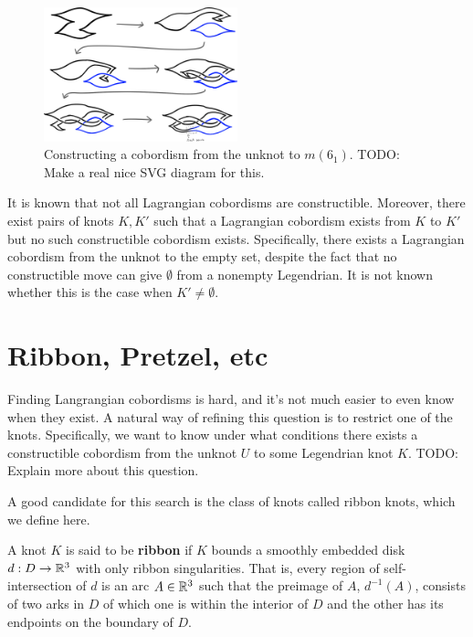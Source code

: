 \begin{figure}[ht!]
    \centering
    \includegraphics[width=0.5\textwidth]{images/cobordism-construction.png}
    \caption{Constructing a cobordism from the unknot to $m(6_1)$.
    TODO: Make a real nice SVG diagram for this.}%
    \label{fig:cobordism-construction}
\end{figure}

It is known that not all Lagrangian cobordisms are constructible. Moreover, there exist pairs of knots $K, K'$ such that a Lagrangian cobordism exists from $K$ to $K'$ but no such constructible cobordism exists. Specifically, there exists a Lagrangian cobordism from the unknot to the empty set, despite the fact that no constructible move can give $\emptyset$ from a nonempty Legendrian. It is not known whether this is the case when $K' \neq \emptyset$.

\section{Ribbon, Pretzel, etc}

Finding Langrangian cobordisms is hard, and it's not much easier to even know when they exist.
A natural way of refining this question is to restrict one of the knots.
Specifically, we want to know under what conditions there exists a constructible cobordism from the unknot $U$ to some Legendrian knot $K$. TODO: Explain more about this question.

A good candidate for this search is the class of knots called ribbon knots, which we define here.

\begin{defn}
    A knot $K$ is said to be \textbf{ribbon} if $K$ bounds a smoothly embedded disk $d: D \to \mathbb{R}^3$ with only ribbon singularities.
    That is, every region of self-intersection of $d$ is an arc $A \in \mathbb{R}^3$ such that the preimage of $A$, $d^{-1} (A)$, consists of two arks in $D$ of which one is within the interior of $D$ and the other has its endpoints on the boundary of $D$.
\end{defn}

